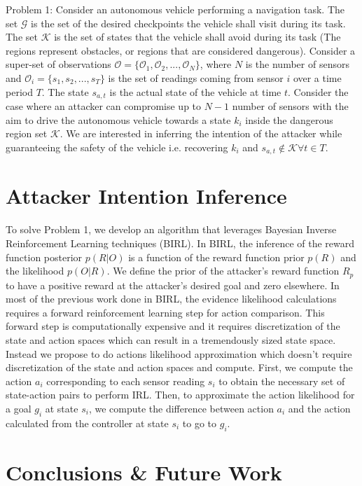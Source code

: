 \documentclass[conference]{IEEEtran}
\begin{document}
Problem 1: Consider an autonomous vehicle performing a navigation task. The set $\mathcal{G}$ is the set of the desired checkpoints the vehicle shall visit during its task. The set $\mathcal{K}$ is the set of states that the vehicle shall avoid during its task (The regions represent obstacles, or regions that are considered dangerous). Consider a super-set of observations $\mathcal{O} = \{\mathcal{O}_1, \mathcal{O}_2, ..., \mathcal{O}_N\}$, where $N$ is the number of sensors and $\mathcal{O}_i = \{s_1, s_2, ..., s_T\}$ is the set of readings coming from sensor $i$ over a time period $T$. The state $s_{a,t}$ is the actual state of the vehicle at time $t$. Consider the case where an attacker can compromise up to $N-1$ number of sensors with the aim to drive the autonomous vehicle towards a state $k_i$ inside the dangerous region set $\mathcal{K}$. We are interested in inferring the intention of the attacker while guaranteeing the safety of the vehicle i.e. recovering $k_i$ and $s_{a,t} \notin \mathcal{K}  \forall t \in T$.

\section{Attacker Intention Inference}\label{sec:intpredic}
To solve Problem 1, we develop an algorithm that leverages Bayesian Inverse Reinforcement Learning techniques (BIRL). In BIRL, the inference of the reward function posterior $p(R|O)$ is a function of the reward function prior $p(R)$ and the likelihood $p(O|R)$. We define the prior of the attacker's reward function $R_p$ to have a positive reward at the attacker's desired goal and zero elsewhere. In most of the previous work done in BIRL, the evidence likelihood calculations requires a forward reinforcement learning step for action comparison. This forward step is computationally expensive and it requires discretization of the state and action spaces which can result in a tremendously sized state space. Instead we propose to do actions likelihood approximation which doesn't require discretization of the state and action spaces and compute. First, we compute the action $a_i$ corresponding to each sensor reading $s_i$ to obtain the necessary set of state-action pairs to perform IRL. Then, to approximate the action likelihood for a goal $g_i$ at state $s_i$, we compute the difference between action $a_i$ and the action calculated from the controller at state $s_i$ to go to $g_i$.

\section{Conclusions \& Future Work}\label{sec:conclusion}
\end{document}

